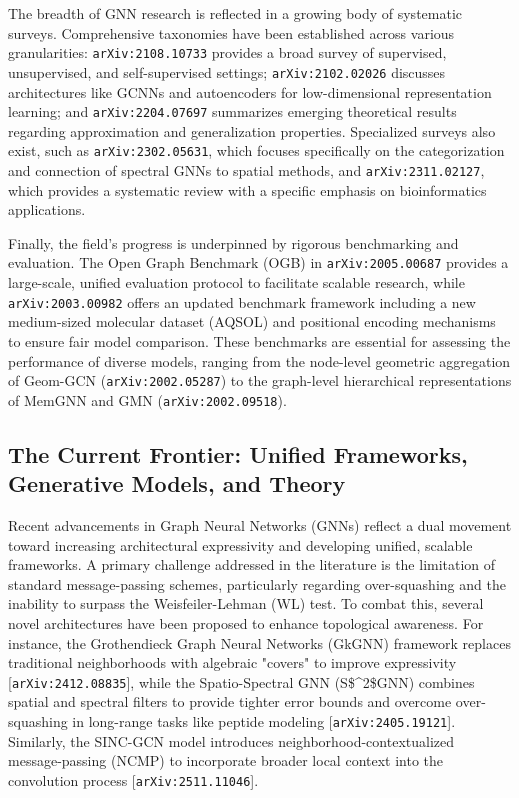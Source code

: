 \documentclass[11pt]{article}
\begin{document}
The breadth of GNN research is reflected in a growing body of systematic surveys. Comprehensive taxonomies have been established across various granularities: \texttt{arXiv:2108.10733} provides a broad survey of supervised, unsupervised, and self-supervised settings; \texttt{arXiv:2102.02026} discusses architectures like GCNNs and autoencoders for low-dimensional representation learning; and \texttt{arXiv:2204.07697} summarizes emerging theoretical results regarding approximation and generalization properties. Specialized surveys also exist, such as \texttt{arXiv:2302.05631}, which focuses specifically on the categorization and connection of spectral GNNs to spatial methods, and \texttt{arXiv:2311.02127}, which provides a systematic review with a specific emphasis on bioinformatics applications.

Finally, the field's progress is underpinned by rigorous benchmarking and evaluation. The Open Graph Benchmark (OGB) in \texttt{arXiv:2005.00687} provides a large-scale, unified evaluation protocol to facilitate scalable research, while \texttt{arXiv:2003.00982} offers an updated benchmark framework including a new medium-sized molecular dataset (AQSOL) and positional encoding mechanisms to ensure fair model comparison. These benchmarks are essential for assessing the performance of diverse models, ranging from the node-level geometric aggregation of Geom-GCN (\texttt{arXiv:2002.05287}) to the graph-level hierarchical representations of MemGNN and GMN (\texttt{arXiv:2002.09518}).

\subsection{The Current Frontier: Unified Frameworks, Generative Models, and Theory}

Recent advancements in Graph Neural Networks (GNNs) reflect a dual movement toward increasing architectural expressivity and developing unified, scalable frameworks. A primary challenge addressed in the literature is the limitation of standard message-passing schemes, particularly regarding over-squashing and the inability to surpass the Weisfeiler-Lehman (WL) test. To combat this, several novel architectures have been proposed to enhance topological awareness. For instance, the Grothendieck Graph Neural Networks (GkGNN) framework replaces traditional neighborhoods with algebraic "covers" to improve expressivity [\texttt{arXiv:2412.08835}], while the Spatio-Spectral GNN (S\$\textasciicircum{}2\$GNN) combines spatial and spectral filters to provide tighter error bounds and overcome over-squashing in long-range tasks like peptide modeling [\texttt{arXiv:2405.19121}]. Similarly, the SINC-GCN model introduces neighborhood-contextualized message-passing (NCMP) to incorporate broader local context into the convolution process [\texttt{arXiv:2511.11046}].
\end{document}
